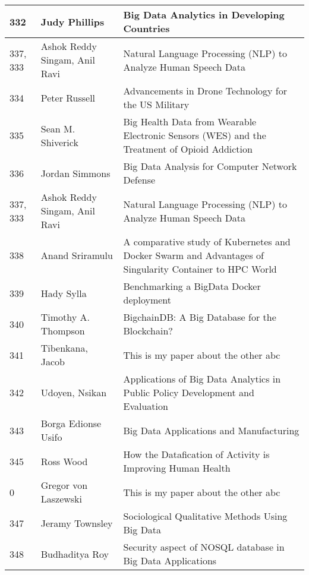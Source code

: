 \documentclass[12pt]{book}
\begin{document}
\begin{footnotesize}
\begin{longtable}{|p{1cm}p{5cm}p{9cm}|}
  \\
\hline
332 & Judy Phillips & Big Data Analytics in Developing Countries  \\
\hline
337, 333 & Ashok Reddy Singam, Anil Ravi & Natural Language Processing (NLP) to Analyze Human Speech Data
  \\
\hline
334 & Peter Russell & Advancements in Drone Technology for the US Military  \\
\hline
335 & Sean M. Shiverick & Big Health Data from Wearable Electronic Sensors (WES) and the Treatment of Opioid Addiction
  \\
\hline
336 & Jordan Simmons & Big Data Analysis for Computer Network Defense  \\
\hline
337, 333 & Ashok Reddy Singam, Anil Ravi & Natural Language Processing (NLP) to Analyze Human Speech Data
  \\
\hline
338 & Anand Sriramulu & A comparative study of Kubernetes and Docker Swarm and Advantages of Singularity Container to HPC World  \\
\hline
339 & Hady Sylla & Benchmarking a BigData Docker deployment  \\
\hline
340 & Timothy A. Thompson & BigchainDB: A Big Database for the Blockchain?  \\
\hline
341 & Tibenkana, Jacob & This is my paper about the other abc  \\
\hline
342 & Udoyen, Nsikan & Applications of Big Data Analytics in Public Policy Development and Evaluation  \\
\hline
343 & Borga Edionse Usifo & Big Data Applications and Manufacturing  \\
\hline
345 & Ross Wood & How the Datafication of Activity is Improving Human Health  \\
\hline
0 & Gregor von Laszewski & This is my paper about the other abc  \\
\hline
347 & Jeramy Townsley & Sociological Qualitative Methods Using Big Data  \\
\hline
348 & Budhaditya Roy & Security aspect of NOSQL database in Big Data Applications  \\
\hline
\end{longtable}
\end{footnotesize}
\newpage
\end{document}
